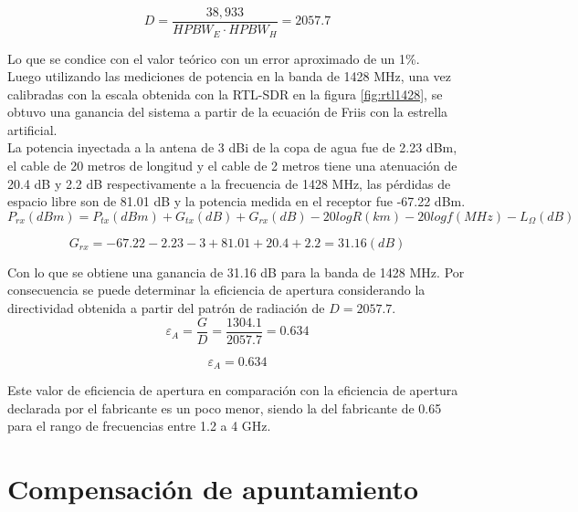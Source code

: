 \begin{equation}
    D = \frac{38,933}{HPBW_{E}\cdot HPBW_{H}} = 2057.7
\end{equation}

Lo que se condice con el valor teórico con un error aproximado de un 1\%.\\

Luego utilizando las mediciones de potencia en la banda de 1428 MHz, una vez calibradas con la escala obtenida con la RTL-SDR en la figura \ref{fig:rtl1428}, se obtuvo una ganancia del sistema a partir de la ecuación de Friis con la estrella artificial.\\

La potencia inyectada a la antena de 3 dBi de la copa de agua fue de 2.23 dBm, el cable de 20 metros de longitud y el cable de 2 metros tiene una atenuación de 20.4 dB y 2.2 dB respectivamente a la frecuencia de 1428 MHz, las pérdidas de espacio libre son de 81.01 dB y la potencia medida en el receptor fue -67.22 dBm.\\

\begin{equation}
    P_{rx}(dBm) = P_{tx}(dBm) + G_{tx}(dB) + G_{rx}(dB) - 20log{R}(km) - 20log{f}(MHz) - L_{\Omega}(dB)
\end{equation}

\begin{equation}
    G_{rx} = -67.22 -2.23 - 3 + 81.01 + 20.4 + 2.2 = 31.16 (dB)
\end{equation}

Con lo que se obtiene una ganancia de 31.16 dB para la banda de 1428 MHz. Por consecuencia se puede determinar la eficiencia de apertura considerando la directividad obtenida a partir del patrón de radiación de $D=2057.7$.\\

\begin{equation}
    \varepsilon_{A} = \frac{G}{D} = \frac{1304.1}{2057.7} = 0.634
\end{equation}

\begin{equation}
    \varepsilon_{A} = 0.634
\end{equation}

Este valor de eficiencia de apertura en comparación con la eficiencia de apertura declarada por el fabricante es un poco menor, siendo la del fabricante de 0.65 para el rango de frecuencias entre 1.2 a 4 GHz.\\

\section{Compensación de apuntamiento}

